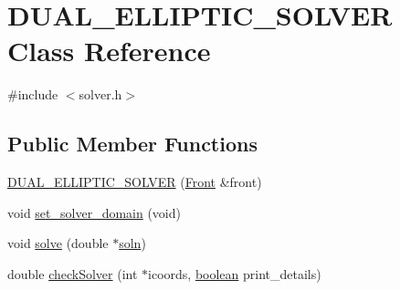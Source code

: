 \hypertarget{class_d_u_a_l___e_l_l_i_p_t_i_c___s_o_l_v_e_r}{}\section{D\+U\+A\+L\+\_\+\+E\+L\+L\+I\+P\+T\+I\+C\+\_\+\+S\+O\+L\+V\+ER Class Reference}
\label{class_d_u_a_l___e_l_l_i_p_t_i_c___s_o_l_v_e_r}


{\ttfamily \#include $<$solver.\+h$>$}

\subsection*{Public Member Functions}
\begin{DoxyCompactItemize}
\item 
\hyperlink{class_d_u_a_l___e_l_l_i_p_t_i_c___s_o_l_v_e_r_ac3f87eb147ca1c9ead0b481eb4563c06}{D\+U\+A\+L\+\_\+\+E\+L\+L\+I\+P\+T\+I\+C\+\_\+\+S\+O\+L\+V\+ER} (\hyperlink{fdecs_8h_ac32202b798f848095c489cfd04c4ca5f}{Front} \&front)
\item 
void \hyperlink{class_d_u_a_l___e_l_l_i_p_t_i_c___s_o_l_v_e_r_a4167d269d96379c6f17b15b6a18d0e8f}{set\+\_\+solver\+\_\+domain} (void)
\item 
void \hyperlink{class_d_u_a_l___e_l_l_i_p_t_i_c___s_o_l_v_e_r_aef69551bf44e25da05e7ef0d00175166}{solve} (double $\ast$\hyperlink{class_d_u_a_l___e_l_l_i_p_t_i_c___s_o_l_v_e_r_ab3ebabe6f5e175663822836a63ca32b8}{soln})
\item 
double \hyperlink{class_d_u_a_l___e_l_l_i_p_t_i_c___s_o_l_v_e_r_aeab5e4fe128f1e1b582418e66e0175e4}{check\+Solver} (int $\ast$icoords, \hyperlink{cdecs_8h_ad048433382a936258fb49e2ec4f148e1}{boolean} print\+\_\+details)
\end{DoxyCompactItemize}
